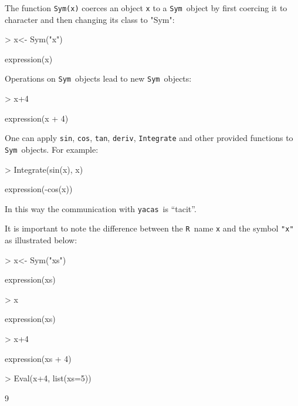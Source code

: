 \documentclass[]{article}
\newcommand{\yacas}{{\tt yacas}}
\newcommand{\code}[1]{{\tt #1}}
\def\R{\texttt{R}}
\def\sym{\texttt{Sym}}
\begin{document}
The function \code{Sym(x)} coerces an object \code{x} to a \sym\ object by
first coercing it to character and then changing its class to "Sym":
\begin{Schunk}
\begin{Sinput}
> x<- Sym("x")
\end{Sinput}
\begin{Soutput}
expression(x)
\end{Soutput}
\end{Schunk}

Operations on \sym\ objects lead to new \sym\ objects:
\begin{Schunk}
\begin{Sinput}
> x+4
\end{Sinput}
\begin{Soutput}
expression(x + 4)
\end{Soutput}
\end{Schunk}

One can apply \code{sin}, \code{cos}, \code{tan}, \code{deriv}, \code{Integrate}
and other provided functions to \sym\ objects. For example:
\begin{Schunk}
\begin{Sinput}
> Integrate(sin(x), x)
\end{Sinput}
\begin{Soutput}
expression(-cos(x))
\end{Soutput}
\end{Schunk}
In this way the communication with \yacas\ is ``tacit''.

It is important to note the difference between the \R\ name \code{x}
and the symbol \code{"x"} as illustrated below:
\begin{Schunk}
\begin{Sinput}
> x<- Sym("xs")
\end{Sinput}
\begin{Soutput}
expression(xs)
\end{Soutput}
\begin{Sinput}
> x
\end{Sinput}
\begin{Soutput}
expression(xs)
\end{Soutput}
\begin{Sinput}
> x+4
\end{Sinput}
\begin{Soutput}
expression(xs + 4)
\end{Soutput}
\begin{Sinput}
> Eval(x+4, list(xs=5))
\end{Sinput}
\begin{Soutput}
[1] 9
\end{Soutput}
\end{Schunk}
\end{document}
